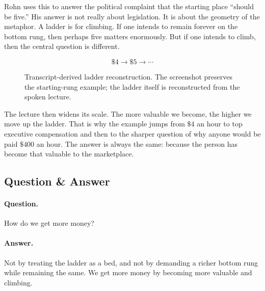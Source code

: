 Rohn uses this to answer the political complaint that the starting place ``should be five.'' His answer is not really about legislation. It is about the geometry of the metaphor. A ladder is for climbing. If one intends to remain forever on the bottom rung, then perhaps five matters enormously. But if one intends to climb, then the central question is different.

\begin{equation}
\$4 \to \$5 \to \cdots
\end{equation}

\begin{figure}[h]
\centering
{}
\caption{Transcript-derived ladder reconstruction. The screenshot preserves the starting-rung example; the ladder itself is reconstructed from the spoken lecture.}
\end{figure}

The lecture then widens its scale. The more valuable we become, the higher we move up the ladder. That is why the example jumps from \(\$4\) an hour to top executive compensation and then to the sharper question of why anyone would be paid \(\$400\) an hour. The answer is always the same: because the person has become that valuable to the marketplace.

\subsection{Question \& Answer}

\paragraph{Question.} How do we get more money?

\paragraph{Answer.} Not by treating the ladder as a bed, and not by demanding a richer bottom rung while remaining the same. We get more money by becoming more valuable and climbing.

